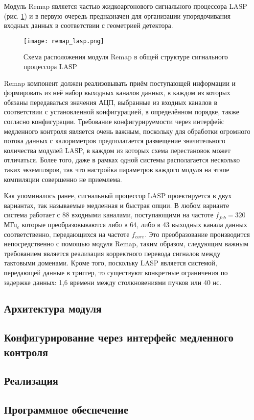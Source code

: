 Модуль Remap является частью жидкоаргонового сигнального процессора LASP (рис. \ref{fig:remap_lasp}) и в первую очередь предназначен для организации упорядочивания входных данных в соответствии с геометрией детектора.\par
\begin{figure}[ht]
    \centering
    \texttt{[image: remap\_lasp.png]}
    \caption{Схема расположения модуля Remap в общей структуре сигнального процессора LASP}
    \label{fig:remap_lasp}
\end{figure}\par
Remap компонент должен реализовывать приём поступающей информации и формировать из неё набор выходных каналов данных, в каждом из которых обязаны передаваться значения АЦП, выбранные из входных каналов в соответствии с установленной конфигурацией, в определённом порядке, также согласно конфигурации. Требование конфигурируемости через интерфейс медленного контроля является очень важным, поскольку для обработки огромного потока данных с калориметров предполагается размещение значительного количества модулей LASP, в каждом из которых схема перестановок может отличаться. Более того, даже в рамках одной системы располагается несколько таких экземпляров, так что настройка параметров каждого модуля на этапе компиляции совершенно не приемлема.\par
Как упоминалось ранее, сигнальный процессор LASP проектируется в двух вариантах, так называемые медленная и быстрая опции. В любом варианте система работает с 88 входными каналами, поступающими на частоте $f_{feb} = 320$ МГц, которые преобразовываются либо в 64, либо в 43 выходных канала данных соответственно, передающихся на частоте $f_{core}$. Это преобразование производится непосредственно с помощью модуля Remap, таким образом, следующим важным требованием является реализация корректного перевода сигналов между тактовыми доменами. Кроме того, поскольку LASP является системой, передающей данные в триггер, то существуют конкретные ограничения по задержке данных: 1,6 времени между столкновениями пучков или 40 нс.\par

\subsection{Архитектура модуля}


\subsection{Конфигурирование через интерфейс медленного контроля}


\subsection{Реализация}


\subsection{Программное обеспечение}

